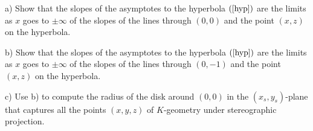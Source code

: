 \documentclass{ximera}
\begin{document}
\begin{exercise}
a) Show that the slopes of the asymptotes to the hyperbola $\left(
\ref{hyp}\right)  $ are the limits as $x$ goes to $\pm\infty$ of the slopes of
the lines through $\left(  0,0\right)  $ and the point $\left(  x,z\right)  $
on the hyperbola.

b) Show that the slopes of the asymptotes to the hyperbola $\left(
\ref{hyp}\right)  $ are the limits as $x$ goes to $\pm\infty$ of the slopes of
the lines through $\left(  0,-1\right)  $ and the point $\left(  x,z\right)  $
on the hyperbola.

c) Use b) to compute the radius of the disk around $\left(  0,0\right)  $ in
the $\left(  x_{s},y_{s}\right)  $-plane that captures all the points $\left(
x,y,z\right)  $ of $K$-geometry under stereographic projection. 
\end{exercise}
\end{document}

